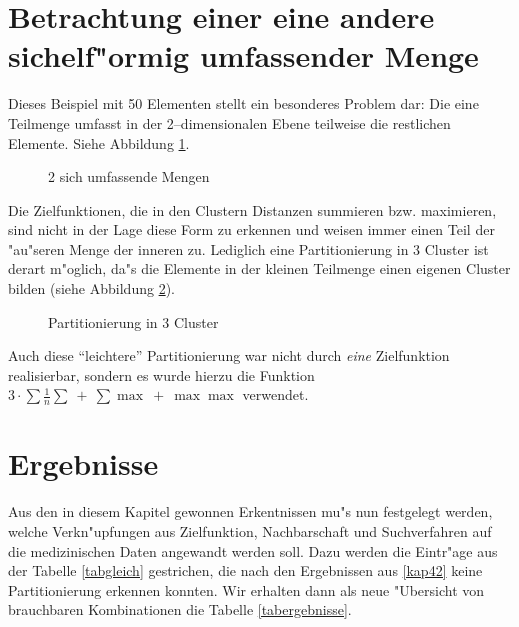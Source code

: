 \section{Betrachtung einer eine andere sichelf"ormig umfassender Menge}
\label{sichel}
Dieses Beispiel mit 50 Elementen stellt ein besonderes Problem dar: Die
eine Teilmenge umfasst in der 2--dimensionalen Ebene teilweise die
restlichen Elemente. Siehe Abbildung \ref{umfassend}.

\begin{figure}[htbp]
\caption{2 sich umfassende Mengen}
\label{umfassend}
\end{figure}

Die Zielfunktionen, die in den Clustern Distanzen summieren bzw. maximieren,
sind nicht in der Lage diese Form zu erkennen und weisen immer einen Teil
der "au"seren Menge der inneren zu. Lediglich eine Partitionierung in 3 
Cluster ist derart m"oglich, da"s die Elemente in der kleinen Teilmenge
einen eigenen Cluster bilden (siehe Abbildung \ref{umfassende}).

\begin{figure}[htbp]
\caption{Partitionierung in 3 Cluster}
\label{umfassende}
\end{figure}

Auch diese "`leichtere"' Partitionierung war nicht durch {\it eine}
Zielfunktion realisierbar, sondern es wurde hierzu die Funktion
 $3\cdot \sum\frac 1n \sum \ + \ \sum\max \ + \ \max\max$ verwendet.


\section{Ergebnisse}
Aus den in diesem Kapitel gewonnen Erkentnissen mu"s nun festgelegt 
werden, welche Verkn"upfungen aus Zielfunktion, Nachbarschaft und
Suchverfahren auf die medizinischen Daten angewandt werden soll.
Dazu werden die Eintr"age aus der Tabelle \ref{tabgleich} gestrichen, 
die nach den Ergebnissen aus \ref{kap42} keine Partitionierung erkennen
konnten. Wir erhalten dann als neue "Ubersicht von brauchbaren Kombinationen 
die Tabelle \ref{tabergebnisse}.

